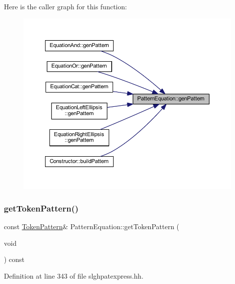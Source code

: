 Here is the caller graph for this function\+:
\nopagebreak
\begin{figure}[H]
\begin{center}
\leavevmode
\includegraphics[width=350pt]{class_pattern_equation_a9838e5bfe5b6013c99567628a6364bfd_icgraph}
\end{center}
\end{figure}
\mbox{\label{class_pattern_equation_a99e0416a51f10f4291087173a321dc55}} 
\subsubsection{\texorpdfstring{getTokenPattern()}{getTokenPattern()}}
{\footnotesize\ttfamily const \mbox{\hyperlink{class_token_pattern}{Token\+Pattern}}\& Pattern\+Equation\+::get\+Token\+Pattern (\begin{DoxyParamCaption}\item[{void}]{ }\end{DoxyParamCaption}) const\hspace{0.3cm}{\ttfamily [inline]}}



Definition at line 343 of file slghpatexpress.\+hh.

